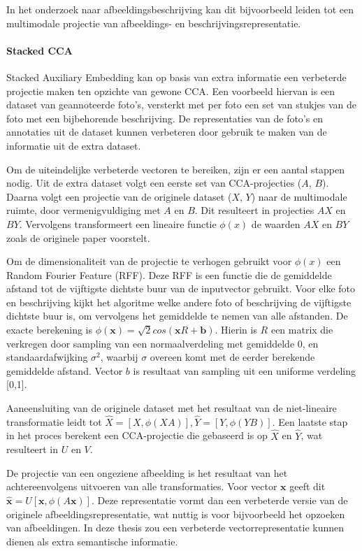 In het onderzoek naar afbeeldingsbeschrijving kan dit bijvoorbeeld leiden tot een multimodale projectie van afbeeldings- en beschrijvingsrepresentatie.

\paragraph{Stacked CCA}

Stacked Auxiliary Embedding\cite{Gong2014} kan op basis van extra informatie een verbeterde projectie maken ten opzichte van gewone CCA. Een voorbeeld hiervan is een dataset van geannoteerde foto's, versterkt met per foto een set van stukjes van de foto met een bijbehorende beschrijving. De representaties van de foto's en annotaties uit de dataset kunnen verbeteren door gebruik te maken van de informatie uit de extra dataset.

Om de uiteindelijke verbeterde vectoren te bereiken, zijn er een aantal stappen nodig. Uit de extra dataset volgt een eerste set van CCA-projecties ($A$, $B$). Daarna volgt een projectie van de originele dataset ($X$, $Y$) naar de multimodale ruimte, door vermenigvuldiging met $A$ en $B$. Dit resulteert in projecties $AX$ en $BY$. Vervolgens transformeert een lineaire functie $\phi(x)$ de waarden $AX$ en $BY$ zoals de originele paper voorstelt.

Om de dimensionaliteit van de projectie te verhogen gebruikt \cite{Gong2014} voor $\phi(x)$ een Random Fourier Feature (RFF). Deze RFF is een functie die de gemiddelde afstand tot de vijftigste dichtste buur van de inputvector gebruikt. Voor elke foto en beschrijving kijkt het algoritme welke andere foto of beschrijving de vijftigste dichtste buur is, om vervolgens het gemiddelde te nemen van alle afstanden. De exacte berekening is $\phi(\mathbf{x})=\sqrt{2}cos(\mathbf{x}R+\mathbf{b})$. Hierin is $R$ een matrix die verkregen door sampling van een normaalverdeling met gemiddelde 0, en standaardafwijking $\sigma^2$, waarbij $\sigma$ overeen komt met de eerder berekende gemiddelde afstand. Vector $b$ is resultaat van sampling uit een uniforme verdeling [0,1].

Aaneensluiting van de originele dataset met het resultaat van de niet-lineaire transformatie leidt tot $\hat{X} = [X, \phi(XA)], \hat{Y} = [Y, \phi(YB)]$. Een laatste stap in het proces berekent een CCA-projectie die gebaseerd is op $\hat{X}$ en $\hat{Y}$, wat resulteert in $U$ en $V$.

De projectie van een ongeziene afbeelding is het resultaat van het achtereenvolgens uitvoeren van alle transformaties. Voor vector $\mathbf{x}$ geeft dit $\mathbf{\hat{x}} = U[\mathbf{x}, \phi(A\mathbf{x})]$. Deze representatie vormt dan een verbeterde versie van de originele afbeeldingsrepresentatie, wat nuttig is voor bijvoorbeeld het opzoeken van afbeeldingen. In deze thesis zou een verbeterde vectorrepresentatie kunnen dienen als extra semantische informatie. 
